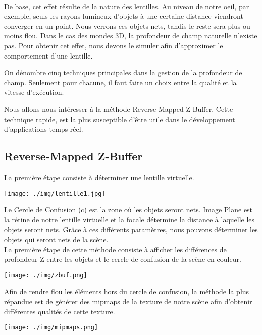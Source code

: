 \documentclass[a4paper]{article}
\begin{document}
\paragraph{} De base, cet effet résulte de la nature des lentilles. Au niveau de notre oeil, par exemple, seuls les rayons lumineux d'objets à une certaine distance viendront converger en un point. Nous verrons ces objets nets, tandis le reste sera plus ou moins flou. 
Dans le cas des mondes 3D, la profondeur de champ naturelle n'existe pas. Pour obtenir cet effet, nous devons le simuler afin d'approximer le comportement d'une lentille.

On dénombre cinq techniques principales dans la gestion de la profondeur de champ. Seulement pour chacune, il faut faire un choix entre la qualité et la vitesse d'exécution. 

Nous allons nous intéresser à la méthode Reverse-Mapped Z-Buffer. Cette technique rapide, est la plus susceptible d'être utile dans le développement d'applications temps réel. 

\subsection{Reverse-Mapped Z-Buffer}
La première étape consiste à déterminer une lentille virtuelle.
\begin{center}
\texttt{[image: ./img/lentille1.jpg]}
\end{center}
Le Cercle de Confusion (c) est la zone où les objets seront nets. Image Plane est la rétine de notre lentille virtuelle et la focale détermine la distance à laquelle les objets seront nets. 
Grâce à ces différents paramètres, nous pouvons déterminer les objets qui seront nets de la scène.\\

La première étape de cette méthode consiste à afficher les différences de profondeur Z entre les objets et le cercle de confusion de la scène en couleur.

\begin{center}
\texttt{[image: ./img/zbuf.png]}
\end{center}

Afin de rendre flou les éléments hors du cercle de confusion, la méthode la plus répandue est de générer des mipmaps de la texture de notre scène afin d'obtenir différentes qualités de cette texture.

\begin{center}
\texttt{[image: ./img/mipmaps.png]}
\end{center}
\end{document}
